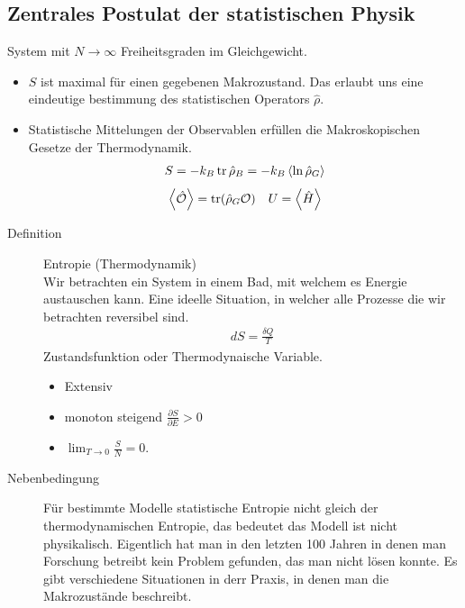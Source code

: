 \documentclass[11pt]{article}
\theoremstyle{plain}
\theoremstyle{mytheoremstyle}
\newcommand{\pd}[2]{\frac{\partial #1 }{\partial #2}}
\newcommand{\trace}{\operatorname{tr}}
\begin{document}
\subsection*{Zentrales Postulat der statistischen Physik}
System mit $N\to \infty$ Freiheitsgraden im Gleichgewicht.
\begin{itemize}
  \item $S$ ist maximal f\"ur einen gegebenen Makrozustand. Das erlaubt uns
    eine eindeutige bestimmung des statistischen Operators $\hat{\rho}$.
  \item Statistische Mittelungen der Observablen erf\"ullen die Makroskopischen
    Gesetze der Thermodynamik.
    \begin{align*}
      S = -k_B \trace \hat{\rho}_B = - k_B \Braket{\ln{\hat{\rho}_G}} \\
    \end{align*}
    \begin{align*}
      \Braket{\hat{\cal{O}}}= \trace (\hat{\rho}_G \mathcal{O}) &&
      U = \Braket{\hat{H}}
    \end{align*}

\end{itemize}
\begin{description}
  \item[Definition] Entropie (Thermodynamik) \\
    Wir betrachten ein System in einem Bad, mit welchem es Energie austauschen
    kann. Eine ideelle Situation, in welcher alle Prozesse die wir betrachten 
    reversibel sind. 
    \begin{align*}
      dS = \frac{\delta Q}{T}
    \end{align*}
    Zustandsfunktion oder Thermodynaische Variable.
    \begin{itemize}
      \item Extensiv
      \item monoton steigend $\pd{S}{E} > 0$
      \item $ \lim_{T \to 0} \frac{S}{N} = 0$.
    \end{itemize}
\end{description}
\begin{description}
  \item[Nebenbedingung] F\"ur bestimmte Modelle statistische Entropie nicht
    gleich der thermodynamischen Entropie, das bedeutet das Modell ist nicht
    physikalisch. Eigentlich hat man in den letzten 100 Jahren in denen man
    Forschung betreibt kein Problem gefunden, das man nicht l\"osen konnte.
    Es gibt verschiedene Situationen in derr Praxis, in denen man die Makrozust\"ande
    beschreibt. 
\end{description}
\end{document}
